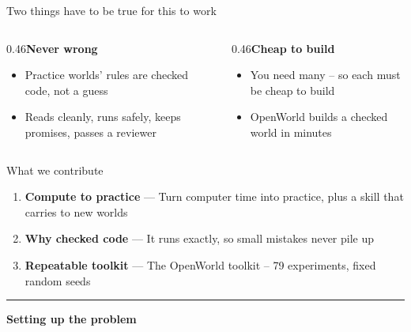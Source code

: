 \documentclass[aspectratio=169,11pt]{beamer}
\begin{document}
\begin{frame}{Two things have to be true for this to work}\vfill
\begin{columns}[T]
\begin{column}{0.46\textwidth}{\color{owmuted}\bfseries\large Never wrong}\par\medskip\begin{itemize}\small \item Practice worlds' rules are checked code, not a guess
\item Reads cleanly, runs safely, keeps promises, passes a reviewer\end{itemize}\end{column}
\begin{column}{0.46\textwidth}{\color{owteal}\bfseries\large Cheap to build}\par\medskip\begin{itemize}\small \item You need many -- so each must be cheap to build
\item OpenWorld builds a checked world in minutes\end{itemize}\end{column}
\end{columns}\vfill\end{frame}
\begin{frame}{What we contribute}\vfill\begin{enumerate}\item \textbf{Compute to practice} --- Turn computer time into practice, plus a skill that carries to new worlds\item \textbf{Why checked code} --- It runs exactly, so small mistakes never pile up\item \textbf{Repeatable toolkit} --- The OpenWorld toolkit -- 79 experiments, fixed random seeds\end{enumerate}\vfill\end{frame}
\begin{frame}[plain]\centering\vfill
{\color{owochre}\rule{40pt}{2.5pt}}\par\vskip10pt
{\color{owdeep}\bfseries\Large Setting up the problem\par}\vfill\end{frame}
\end{document}
